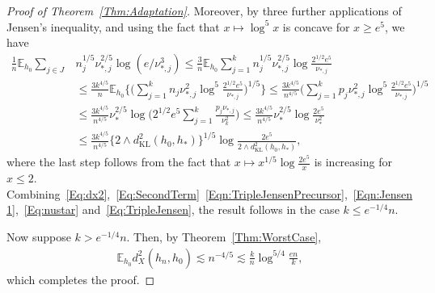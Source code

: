 \documentclass[a4paper,12pt]{article}
\newcommand{\red}[1]{{\color{red}#1}}
\begin{document}
\begin{proof}[Proof of Theorem~\ref{Thm:Adaptation}]
Moreover, by three further applications of Jensen's inequality, and using the fact that $x \mapsto \log^5 x$ is concave for $x \geq e^5$, we have
  \begin{align}
\label{Eq:TripleJensen}
    \frac{1}{n} \mathbb{E}_{h_0} \sum_{j \in J} &n_j^{1/5} \nu_{*,j}^{2/5} \log(e/\nu_{*,j}^3) \leq \frac{3}{n} \mathbb{E}_{h_0} \sum_{j =1}^k n_j^{1/5} \nu_{*,j}^{2/5} \log \frac{2^{1/2}e^5}{\nu_{*,j}} \nonumber \\
&\leq \frac{3k^{4/5}}{n} \mathbb{E}_{h_0} \biggl\{\biggl(\sum_{j=1}^k n_j \nu_{*,j}^2 \log^5 \frac{2^{1/2}e^5}{\nu_{*,j}}\biggr)^{1/5}\biggr\} \leq \frac{3k^{4/5}}{n^{4/5}}\biggl(\sum_{j=1}^k p_j \nu_{*,j}^2 \log^5 \frac{2^{1/2}e^5}{\nu_{*,j}}\biggr)^{1/5} \nonumber \\
                                                                                              &\leq \frac{3k^{4/5}}{n^{4/5}}\nu_*^{2/5}\log\biggl(2^{1/2}e^5\sum_{j=1}^k \frac{p_j\nu_{*,j}}{\nu_k^2}\biggr) \leq \frac{3k^{4/5}}{n^{4/5}}\nu_*^{2/5}\log \frac{2e^5}{\nu_*^2} \nonumber \\
&\leq \frac{3k^{4/5}}{n^{4/5}}\{2 \wedge d_{\mathrm{KL}}^2(h_0,h_*)\}^{1/5}\log \frac{2e^5}{2 \wedge d_{\mathrm{KL}}^2(h_0,h_*)},
  \end{align}
where the last step follows from the fact that $x \mapsto x^{1/5} \log \frac{2e^5}{x}$ is increasing for $x \leq 2$.  Combining~\eqref{Eq:dx2},~\eqref{Eq:SecondTerm}~\eqref{Eqn:TripleJensenPrecursor},~\eqref{Eqn:Jensen1},~\eqref{Eq:nustar} and~\eqref{Eq:TripleJensen}, the result follows in the case $k \leq e^{-1/4}n$.

Now suppose $k > e^{-1/4} n$. Then, by Theorem~\ref{Thm:WorstCase},
\begin{align*}
  \mathbb{E}_{h_0} d^2_X(\hat{h}_n, h_0) \lesssim n^{-4/5} \lesssim \frac{k}{n} \log^{5/4} \frac{en}{k},
\end{align*}
which completes the proof.
\end{proof}
\end{document}
